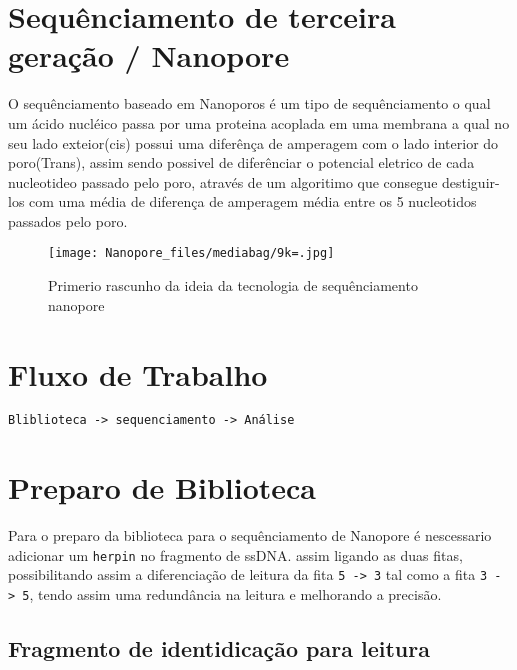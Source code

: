 \documentclass[
  letterpaper,
  DIV=11,
  numbers=noendperiod]{scrartcl}
\author{}
\date{2024-06-18}
\begin{document}
\section{Sequênciamento de terceira geração /
Nanopore}\label{sequuxeanciamento-de-terceira-gerauxe7uxe3o-nanopore}

O sequênciamento baseado em Nanoporos é um tipo de sequênciamento o qual
um ácido nucléico passa por uma proteina acoplada em uma membrana a qual
no seu lado exteior(cis) possui uma diferênça de amperagem com o lado
interior do poro(Trans), assim sendo possivel de diferênciar o potencial
eletrico de cada nucleotideo passado pelo poro, através de um algoritimo
que consegue destiguir-los com uma média de diferença de amperagem média
entre os 5 nucleotidos passados pelo poro.

\begin{figure}[H]

{\centering \texttt{[image: Nanopore\_files/mediabag/9k=.jpg]}

}

\caption{Primerio rascunho da ideia da tecnologia de sequênciamento
nanopore}

\end{figure}%

\section{Fluxo de Trabalho}\label{fluxo-de-trabalho}

\begin{verbatim}
Bliblioteca -> sequenciamento -> Análise
\end{verbatim}

\section{Preparo de Biblioteca}\label{preparo-de-biblioteca}

Para o preparo da biblioteca para o sequênciamento de Nanopore é
nescessario adicionar um \texttt{herpin} no fragmento de ssDNA. assim
ligando as duas fitas, possibilitando assim a diferenciação de leitura
da fita
\texttt{5\textquotesingle{}\ -\textgreater{}\ 3\textquotesingle{}} tal
como a fita
\texttt{3\textquotesingle{}\ -\textgreater{}\ 5\textquotesingle{}},
tendo assim uma redundância na leitura e melhorando a precisão.

\subsection{Fragmento de identidicação para
leitura}\label{fragmento-de-identidicauxe7uxe3o-para-leitura}
\end{document}
